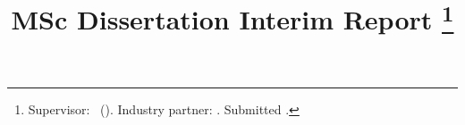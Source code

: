 \title{\reporttitle\\
{\normalsize MSc Dissertation Interim Report}
\thanks{Supervisor: \supervisorname\ (\supervisoremail). Industry partner: \industrypartner. Submitted \submissiondate.}
}

\author{\IEEEauthorblockN{\studentname}
}
